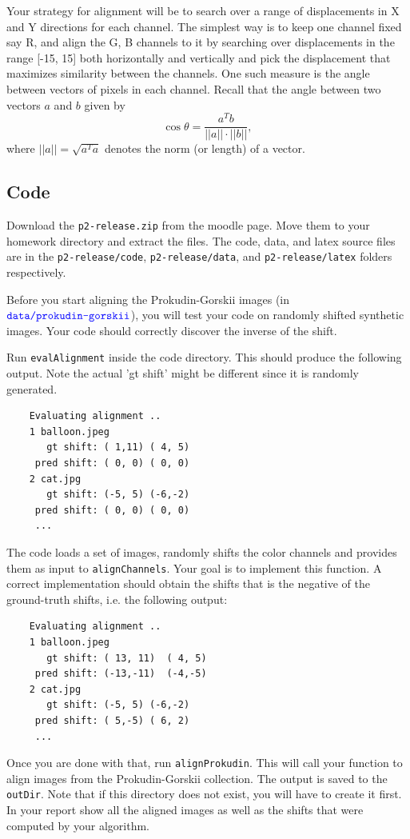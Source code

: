 \documentclass[10pt,letterpaper]{article}
\newcommand{\cmd}[1] {{\color{blue}\texttt{#1}}}
\begin{document}
Your strategy for alignment will be to search over a range of displacements in X and Y directions for each channel.
The simplest way is to keep one channel fixed say R, and align the G, B channels to it by searching over displacements in the range [-15, 15] both horizontally and vertically and pick the displacement that maximizes similarity between the channels.
One such measure is the angle between vectors of pixels in each channel. Recall that the angle between two vectors $a$ and $b$ given by
$$
	\cos \theta = \frac{a^Tb} {||a||\cdot||b||},
$$
where $||a|| = \sqrt{a^Ta}$ denotes the norm (or length) of a vector. 

\subsection{Code}
Download the \cmd{p2-release.zip} from the moodle page. Move them to your homework directory and extract the files. The code, data, and latex source files are in the \cmd{p2-release/code}, \cmd{p2-release/data}, and \cmd{p2-release/latex} folders respectively.

Before you start aligning the Prokudin-Gorskii images (in $\cmd{data/prokudin-gorskii}$), you will test your code on randomly shifted synthetic images. Your code should correctly discover the inverse of the shift.

Run \cmd{evalAlignment} inside the code directory. This should produce the following output. Note the actual 'gt shift' might be different since it is randomly generated.
\begin{verbatim}
    Evaluating alignment ..
    1 balloon.jpeg
	   gt shift: ( 1,11) ( 4, 5)
	 pred shift: ( 0, 0) ( 0, 0)
    2 cat.jpg
	   gt shift: (-5, 5) (-6,-2)
	 pred shift: ( 0, 0) ( 0, 0)
     ...
\end{verbatim}
    
The code loads a set of images, randomly shifts the color channels and provides them as input to \cmd{alignChannels}. Your goal is to implement this function. A correct implementation should obtain the shifts that is the negative of the ground-truth shifts, i.e. the following output:

\begin{verbatim}
    Evaluating alignment ..
    1 balloon.jpeg
	   gt shift: ( 13, 11)  ( 4, 5)
	 pred shift: (-13,-11)  (-4,-5)
    2 cat.jpg
	   gt shift: (-5, 5) (-6,-2)
	 pred shift: ( 5,-5) ( 6, 2)
     ...
\end{verbatim}

Once you are done with that, run \cmd{alignProkudin}. This will call your function to align images from the Prokudin-Gorskii collection. The output is saved to the \cmd{outDir}. Note that if this directory does not exist, you will have to create it first. 
In your report show all the aligned images as well as the shifts that were computed by your algorithm.
\end{document}
